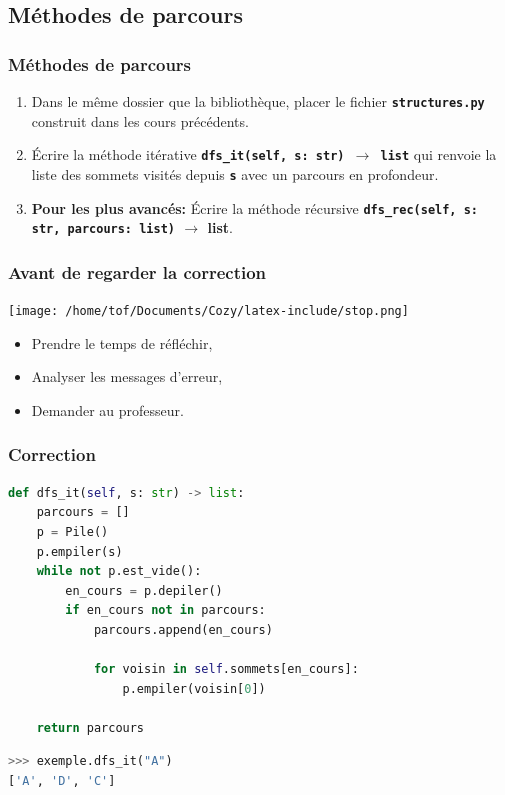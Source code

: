 \documentclass[svgnames,11pt]{beamer}
\begin{document}
\subsection{Méthodes de parcours}
\begin{frame}
    \frametitle{Méthodes de parcours}
\begin{activite}
\begin{enumerate}
    \item Dans le même dossier que la bibliothèque, placer le fichier \textbf{\texttt{structures.py}} construit dans les cours précédents.
    \item Écrire la méthode itérative \textbf{\texttt{dfs\_it(self, s: str) $\rightarrow$ list}} qui renvoie la liste des sommets visités depuis \textbf{\texttt{s}} avec un parcours en profondeur.
    \item \textbf{Pour les plus avancés:} Écrire la méthode récursive \textbf{\texttt{dfs\_rec(self, s: str, parcours: list)} $\rightarrow$ list}.
\end{enumerate}
\end{activite}
    
\end{frame}
\begin{frame}
    \frametitle{Avant de regarder la correction}
\begin{center}
    \centering
    \texttt{[image: /home/tof/Documents/Cozy/latex-include/stop.png]}
    \end{center}
{\Large
    \begin{itemize}
        \item Prendre le temps de réfléchir,
        \item Analyser les messages d'erreur,
        \item Demander au professeur.
    \end{itemize}
}
\end{frame}
\begin{frame}[fragile]
    \frametitle{Correction}

\begin{center}
\begin{lstlisting}[language=Python , basicstyle=\ttfamily\small, xleftmargin=0.2em, xrightmargin=0em]
def dfs_it(self, s: str) -> list:
    parcours = []
    p = Pile()
    p.empiler(s)
    while not p.est_vide():
        en_cours = p.depiler()
        if en_cours not in parcours:
            parcours.append(en_cours)
            
            for voisin in self.sommets[en_cours]:
                p.empiler(voisin[0])
                
    return parcours
\end{lstlisting}
\begin{lstlisting}[language=Python , basicstyle=\ttfamily\small, xleftmargin=0.2em, xrightmargin=0em]
>>> exemple.dfs_it("A")
['A', 'D', 'C']
\end{lstlisting}
\end{center}  

\end{frame}
\end{document}
